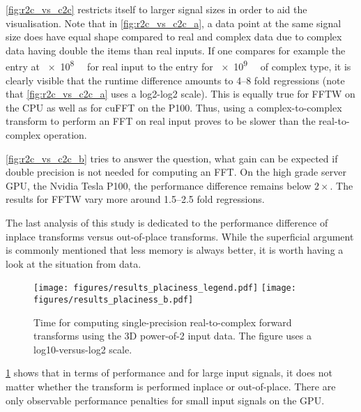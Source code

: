 \cref{fig:r2c_vs_c2c} restricts itself to larger signal sizes in order to aid the visualisation. Note that in \cref{fig:r2c_vs_c2c_a}, a data point at the same signal size does have equal shape compared to real and complex data due to complex data having double the items than real inputs. If one compares for example the entry at \SI[exponent-base=2]{e8}{\mebi\byte} for real input to the entry for \SI[exponent-base=2]{e9}{\mebi\byte} of complex type, it is clearly visible that the runtime difference amounts to \numrange{4}{8} fold regressions (note that \cref{fig:r2c_vs_c2c_a} uses a log2-log2 scale). This is equally true for FFTW on the CPU as well as for cuFFT on the P100. Thus, using a complex-to-complex transform to perform an FFT on real input proves to be slower than the real-to-complex operation.

\cref{fig:r2c_vs_c2c_b} tries to answer the question, what gain can be expected if double precision is not needed for computing an FFT. On the high grade server GPU, the Nvidia Tesla P100, the performance difference remains below $2{\times}$. The results for FFTW vary more around \numrange{1.5}{2.5} fold regressions. 


The last analysis of this study is dedicated to the performance difference of inplace transforms versus out-of-place transforms. While the superficial argument is commonly mentioned that less memory is always better, it is worth having a look at the situation from data.

\begin{figure}[!tbp]
  \centering
  \texttt{[image: figures/results\_placiness\_legend.pdf]}
  \texttt{[image: figures/results\_placiness\_b.pdf]}
  \caption{Time for computing single-precision real-to-complex forward transforms using the 3D power-of-2 input data. The figure uses a log10-versus-log2 scale.}
  \label{fig:placiness}
\end{figure}

\cref{fig:placiness} shows that in terms of performance and for large input signals, it does not matter whether the transform is performed inplace or out-of-place. There are only observable performance penalties for small input signals on the GPU.  
